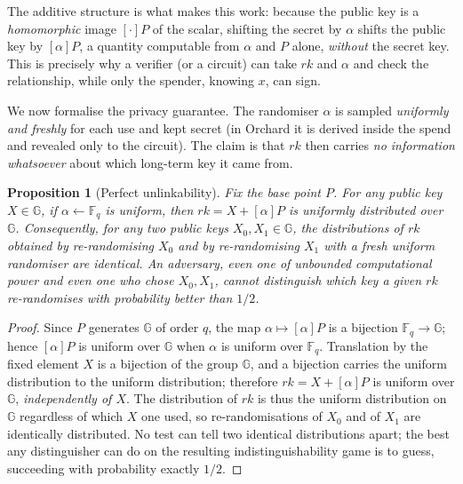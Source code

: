 \documentclass[11pt,a4paper]{article}
\newtheorem{proposition}[theorem]{Proposition}
\theoremstyle{definition}
\theoremstyle{remark}
\newcommand{\G}{\ensuremath{\mathbb{G}}}
\newcommand{\Fq}{\ensuremath{\mathbb{F}_{q}}}
\begin{document}
The additive structure is what makes this work: because the public key is a \emph{homomorphic} image \([{\cdot}]P\) of the scalar, shifting the secret by \(\alpha\) shifts the public key by \([\alpha]P\), a quantity computable from \(\alpha\) and \(P\) alone, \emph{without} the secret key. This is precisely why a verifier (or a circuit) can take \(\mathit{rk}\) and \(\alpha\) and check the relationship, while only the spender, knowing \(x\), can sign.

We now formalise the privacy guarantee. The randomiser \(\alpha\) is sampled \emph{uniformly and freshly} for each use and kept secret (in Orchard it is derived inside the spend and revealed only to the circuit). The claim is that \(\mathit{rk}\) then carries \emph{no information whatsoever} about which long-term key it came from.

\begin{proposition}[Perfect unlinkability]\label{signatures:prop:unlink}
Fix the base point \(P\). For any public key \(X \in \G\), if \(\alpha \gets \Fq\) is uniform, then \(\mathit{rk} = X + [\alpha]P\) is uniformly distributed over \(\G\). Consequently, for \emph{any two} public keys \(X_0, X_1 \in \G\), the distributions of \(\mathit{rk}\) obtained by re-randomising \(X_0\) and by re-randomising \(X_1\) with a fresh uniform randomiser are \emph{identical}. An adversary, even one of unbounded computational power and even one who chose \(X_0, X_1\), cannot distinguish which key a given \(\mathit{rk}\) re-randomises with probability better than \(1/2\).
\end{proposition}

\begin{proof}
Since \(P\) generates \(\G\) of order \(q\), the map \(\alpha \mapsto [\alpha]P\) is a bijection \(\Fq \to \G\); hence \([\alpha]P\) is uniform over \(\G\) when \(\alpha\) is uniform over \(\Fq\). Translation by the fixed element \(X\) is a bijection of the group \(\G\), and a bijection carries the uniform distribution to the uniform distribution; therefore \(\mathit{rk} = X + [\alpha]P\) is uniform over \(\G\), \emph{independently of \(X\)}. The distribution of \(\mathit{rk}\) is thus the uniform distribution on \(\G\) regardless of which \(X\) one used, so re-randomisations of \(X_0\) and of \(X_1\) are identically distributed. No test can tell two identical distributions apart; the best any distinguisher can do on the resulting indistinguishability game is to guess, succeeding with probability exactly \(1/2\).
\end{proof}
\end{document}
